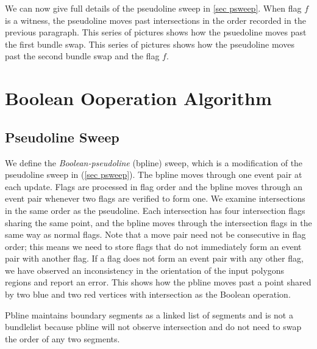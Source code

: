 \documentclass[11pt]{article}
\begin{document}
We can now give full details of the pseudoline sweep in \ref{sec psweep}.
When flag $f$ is a witness, the pseudoline moves past intersections in the order recorded in the previous paragraph.
This series of pictures shows how the psuedoline moves past the first bundle swap.
This series of pictures shows how the pseudoline moves past the second bundle swap and the flag $f$.

\section{Boolean Ooperation Algorithm}
\subsection{Pseudoline Sweep} \label{sec psweep2}
We define the \textit{Boolean-pseudoline} (bpline) sweep, which is a modification of the pseudoline sweep in (\ref{sec psweep}).
The bpline moves through one event pair at each update.
Flags are processed in flag order and the bpline moves through an event pair whenever two flags are verified to form one.
We examine intersections in the same order as the pseudoline.
Each intersection has four intersection flags sharing the same point, and the bpline moves through the intersection flags in the same way as normal flags.
Note that a move pair need not be consecutive in flag order; this means we need to store flags that do not immediately form an event pair with another flag.
If a flag does not form an event pair with any other flag, we have observed an inconsistency in the orientation of the input polygons regions and report an error.
This shows how the pbline moves past a point shared by two blue and two red vertices with intersection as the Boolean operation.

Pbline maintains boundary segments as a linked list of segments and is not a bundlelist because pbline will not observe intersection and do not need to swap the order of any two segments.



\end{document}
